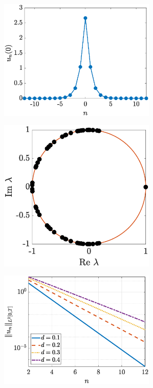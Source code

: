 \documentclass[12pt,reqno]{amsart}
\theoremstyle{definition}
\begin{document}
\begin{figure}
	\begin{center}
	\begin{subfigure}{0.45\linewidth}
		\caption{}
		\includegraphics[width=7.5cm]{singleun0.eps}
		\label{fig:singlea}
	\end{subfigure}
	\begin{subfigure}{0.45\linewidth}
		\caption{}
		\includegraphics[width=7.5cm]{singlespec.eps}
		\label{fig:singleb}
	\end{subfigure}
	\begin{subfigure}{0.45\linewidth}
		\caption{}
		\includegraphics[width=7.5cm]{singledecay.eps}
		\label{fig:singlec}
	\end{subfigure}
	\begin{subfigure}{0.45\linewidth}

\end{subfigure}
\end{center}
\end{figure}
\end{document}
